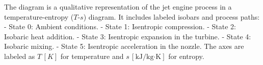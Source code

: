 The diagram is a qualitative representation of the jet engine process in a temperature-entropy (\( T \)-\( s \)) diagram. It includes labeled isobars and process paths:  
- State 0: Ambient conditions.  
- State 1: Isentropic compression.  
- State 2: Isobaric heat addition.  
- State 3: Isentropic expansion in the turbine.  
- State 4: Isobaric mixing.  
- State 5: Isentropic acceleration in the nozzle.  
The axes are labeled as \( T \, [K] \) for temperature and \( s \, [\text{kJ}/\text{kg·K}] \) for entropy.